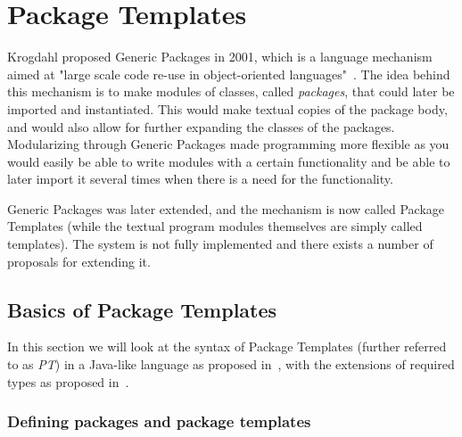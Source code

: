 \section{Package Templates}\label{sec:package-templates}


Krogdahl proposed Generic Packages in 2001, which is a language mechanism aimed at "large scale code re-use in object-oriented languages"~\cite{krogdahl:GP}.
The idea behind this mechanism is to make modules of classes, called \textit{packages}, that could later be imported and instantiated.
This would make textual copies of the package body, and would also allow for further expanding the classes of the packages.
Modularizing through Generic Packages made programming more flexible as you would easily be able to write modules with a certain functionality and be able to later import it several times when there is a need for the functionality.

Generic Packages was later extended, and the mechanism is now called Package Templates (while the textual program modules themselves are simply called templates).
The system is not fully implemented and there exists a number of proposals for extending it.

\subsection{Basics of Package Templates}\label{subsec:basics-of-package-templates}

In this section we will look at the syntax of Package Templates (further referred to as \emph{PT}) in a Java-like language as proposed in~\cite{jot}, with the extensions of required types as proposed in~\cite{requiredtypes}.

\subsubsection{Defining packages and package templates}

